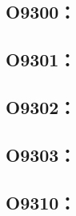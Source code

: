 \clearpage
\subsection{O9300：}



\clearpage
\subsection{O9301：}



\clearpage
\subsection{O9302：}



\clearpage
\subsection{O9303：}



\clearpage
\subsection{O9310：}



\clearpage
